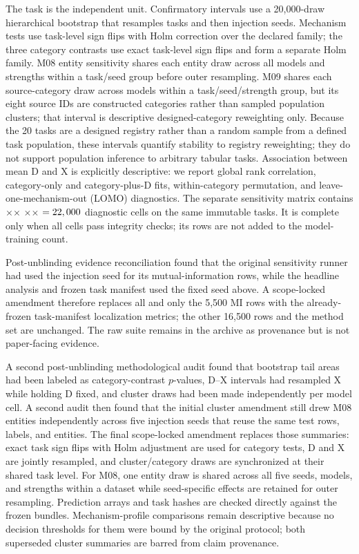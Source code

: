 \documentclass[letterpaper]{article}
\begin{document}
The task is the independent unit.  Confirmatory intervals use a 20,000-draw
hierarchical bootstrap that resamples tasks and then injection seeds.  Mechanism
tests use task-level sign flips with Holm correction over the declared family;
the three category contrasts use exact task-level sign flips and form a separate
Holm family.  M08 entity sensitivity shares each entity draw across all models
and strengths within a task/seed group before outer resampling.  M09 shares each
source-category draw across models within a task/seed/strength group, but its
eight source IDs are constructed categories rather than sampled population
clusters; that interval is descriptive designed-category reweighting only.
Because the 20 tasks are a designed registry rather than a random
sample from a defined task population, these intervals quantify stability to
registry reweighting; they do not support population inference to arbitrary
tabular tasks.  Association between mean D and X is explicitly descriptive: we
report global rank correlation, category-only and category-plus-D fits,
within-category permutation, and leave-one-mechanism-out (LOMO) diagnostics.
The separate sensitivity matrix contains
\LBControlledTaskCount{}$\times$\LBMechanismCount{}$\times$
\LBStrengthCount{}$\times$\LBSeedCount{}$\times$
\LBDiagnosticMethodCount{}$=22,000{}$ diagnostic cells on
the same immutable tasks.  It is complete only when all
\LBSuccessfulDiagnosticCells{} cells pass integrity checks; its rows are not
added to the \LBExpectedCells{} model-training count.

Post-unblinding evidence reconciliation found that the original sensitivity
runner had used the injection seed for its mutual-information rows, while the
headline analysis and frozen task manifest used the fixed seed above.  A
scope-locked amendment therefore replaces all and only the 5,500 MI rows with
the already-frozen task-manifest localization metrics; the other 16,500 rows
and the method set are unchanged.  The raw suite remains in the
archive as provenance but is not paper-facing evidence.

A second post-unblinding methodological audit found that bootstrap tail areas
had been labeled as category-contrast $p$-values, D--X intervals had resampled X
while holding D fixed, and cluster draws had been made independently per model
cell.  A second audit then found that the initial cluster amendment still drew
M08 entities independently across five injection seeds that reuse the same test
rows, labels, and entities.  The final scope-locked amendment replaces those summaries:
exact task sign flips with Holm adjustment are used for category tests, D and X
are jointly resampled, and cluster/category draws are synchronized at their
shared task level.  For M08, one entity draw is shared across all five seeds,
models, and strengths within a dataset while seed-specific effects are retained
for outer resampling.  Prediction arrays and task hashes are checked directly
against the frozen bundles.  Mechanism-profile comparisons remain descriptive
because no decision thresholds for them were bound by the original protocol;
both superseded cluster summaries are barred from claim provenance.
\end{document}
